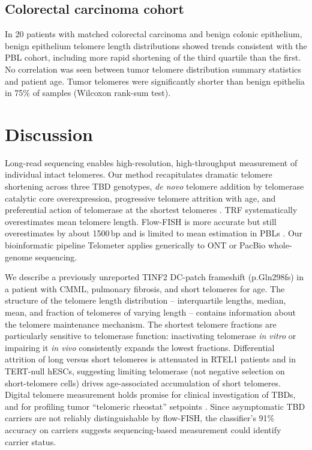 \documentclass[11pt]{article}
\begin{document}
\subsection{Colorectal carcinoma cohort}
In 20 patients with matched colorectal carcinoma and benign colonic epithelium, benign epithelium telomere length distributions showed trends consistent with the PBL cohort, including more rapid shortening of the third quartile than the first. No correlation was seen between tumor telomere distribution summary statistics and patient age. Tumor telomeres were significantly shorter than benign epithelia in 75\% of samples (Wilcoxon rank-sum test).

\section{Discussion}
Long-read sequencing enables high-resolution, high-throughput measurement of individual intact telomeres. Our method recapitulates dramatic telomere shortening across three TBD genotypes, \textit{de novo} telomere addition by telomerase catalytic core overexpression, progressive telomere attrition with age, and preferential action of telomerase at the shortest telomeres \citep{r8,r33,r37}. TRF systematically overestimates mean telomere length. Flow-FISH is more accurate but still overestimates by about 1500\,bp and is limited to mean estimation in PBLs \citep{r15,r16,r17,r21,r23}. Our bioinformatic pipeline Telometer applies generically to ONT or PacBio whole-genome sequencing.

We describe a previously unreported TINF2 DC-patch frameshift (p.Gln298fs) in a patient with CMML, pulmonary fibrosis, and short telomeres for age. The structure of the telomere length distribution -- interquartile lengths, median, mean, and fraction of telomeres of varying length -- contains information about the telomere maintenance mechanism. The shortest telomere fractions are particularly sensitive to telomerase function: inactivating telomerase \textit{in vitro} or impairing it \textit{in vivo} consistently expands the lowest fractions. Differential attrition of long versus short telomeres is attenuated in RTEL1 patients and in TERT-null hESCs, suggesting limiting telomerase (not negative selection on short-telomere cells) drives age-associated accumulation of short telomeres. Digital telomere measurement holds promise for clinical investigation of TBDs, and for profiling tumor ``telomeric rheostat'' setpoints \citep{r39}. Since asymptomatic TBD carriers are not reliably distinguishable by flow-FISH, the classifier's 91\% accuracy on carriers suggests sequencing-based measurement could identify carrier status.



\end{document}
